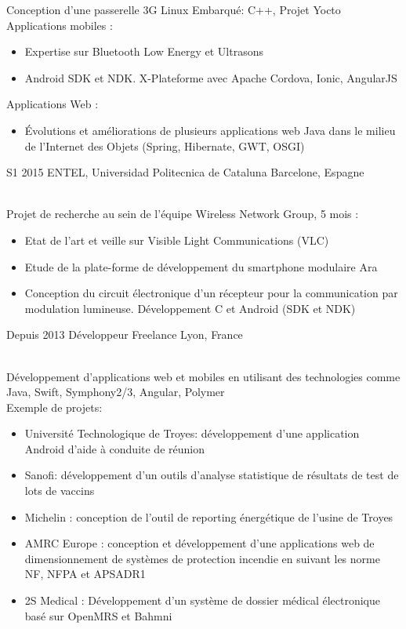 \documentclass[]{cv-style}          %
\begin{document}
\begin{entrylist}
{  Conception d'une passerelle 3G Linux Embarqué: C++, Projet Yocto\\
  Applications mobiles :
  \begin{itemize}
    \item Expertise sur Bluetooth Low Energy et Ultrasons
    \item Android SDK et NDK. X-Plateforme avec Apache Cordova, Ionic, AngularJS
  \end{itemize}
  Applications Web :
  \begin{itemize}
    \item Évolutions et améliorations de plusieurs applications web Java dans le milieu de l'Internet des Objets (Spring, Hibernate, GWT, OSGI)
  \end{itemize}}

 \entry
  {S1 2015 }
  {ENTEL, Universidad Politecnica de Cataluna}
  {Barcelone, Espagne}
  {\\
  Projet de recherche au sein de l'équipe Wireless Network Group, 5 mois :
  \begin{itemize}
    \item Etat de l'art et veille sur Visible Light Communications (VLC)
    \item Etude de la plate-forme de développement du smartphone modulaire Ara
    \item Conception du circuit électronique d'un récepteur pour la communication par modulation lumineuse. Développement C et Android (SDK et NDK)
  \end{itemize}}
\end{entrylist}

\begin{entrylist}
\entry
  {Depuis 2013}
  {Développeur Freelance}
  {Lyon, France}
  {\\
  Développement d'applications web et mobiles en utilisant des technologies comme Java, Swift, Symphony2/3, Angular, Polymer\\
  Exemple de projets:
  \begin{itemize}
    \item Université Technologique de Troyes: développement d'une application Android d'aide à conduite de réunion
    \item Sanofi: développement d'un outils d'analyse statistique de résultats de test de lots de vaccins
    \item Michelin : conception de l’outil de reporting énergétique de l'usine de Troyes
    \item AMRC Europe : conception et développement d'une applications web de dimensionnement de systèmes de protection incendie en suivant les norme NF, NFPA et APSADR1
    \item 2S Medical : Développement d'un système de dossier médical électronique basé sur OpenMRS et Bahmni
  \end{itemize}}
\end{entrylist}
\end{document}
